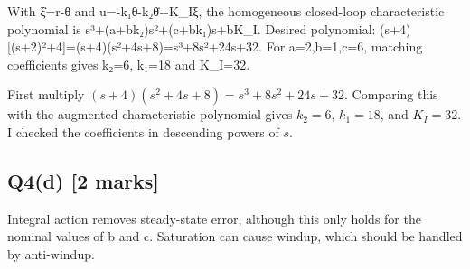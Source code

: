 \documentclass[11pt,a4paper]{article}
\begin{document}
With ξ̇=r-θ and u=-k₁θ-k₂θ̇+K\_Iξ, the homogeneous closed-loop characteristic polynomial is s³+(a+bk₂)s²+(c+bk₁)s+bK\_I.
Desired polynomial: (s+4)[(s+2)²+4]=(s+4)(s²+4s+8)=s³+8s²+24s+32.
For a=2,b=1,c=6, matching coefficients gives k₂=6, k₁=18 and K\_I=32.\par\smallskip First multiply $(s+4)(s^2+4s+8)=s^3+8s^2+24s+32$. Comparing this with the augmented characteristic polynomial gives $k_2=6$, $k_1=18$, and $K_I=32$. I checked the coefficients in descending powers of $s$.

\subsection*{Q4(d) \hfill [2 marks]}

Integral action removes steady-state error, although this only holds for the nominal values of b and c.
Saturation can cause windup, which should be handled by anti-windup.
\end{document}
